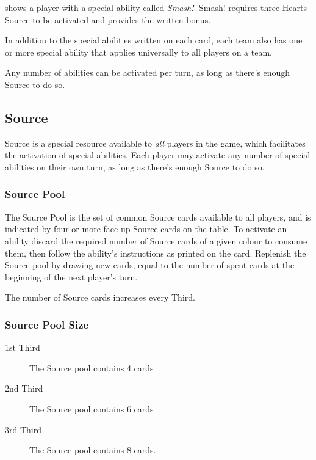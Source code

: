  shows a player with a special ability called \textit{Smash!}.
Smash! requires three Hearts Source to be activated and provides the written bonus.

In addition to the special abilities written on each card, each team also has one or more special ability that applies universally to all players on a team.

\begin{note} 
    Any number of abilities can be activated per turn, as long as there's enough Source to do so.
\end{note}
\subsection{Source}
Source is a special resource available to \textit{all} players in the game, which facilitates the activation of special abilities.
Each player may activate any number of special abilities on their own turn, as long as there's enough Source to do so.

\subsubsection{Source Pool}
The Source Pool is the set of common Source cards available to all players, and is indicated by four or more face-up Source cards on the table.
To activate an ability discard the required number of Source cards of a given colour to consume them, then follow the ability's instructions as printed on the card.
Replenish the Source pool by drawing new cards, equal to the number of spent cards at the beginning of the next player's turn.

The number of Source cards increases every Third.
\subsubsection{Source Pool Size}
\begin{description}
    \item[1st Third] The Source pool contains 4 cards
    \item[2nd Third] The Source pool contains 6 cards
    \item[3rd Third] The Source pool contains 8 cards.
\end{description}
